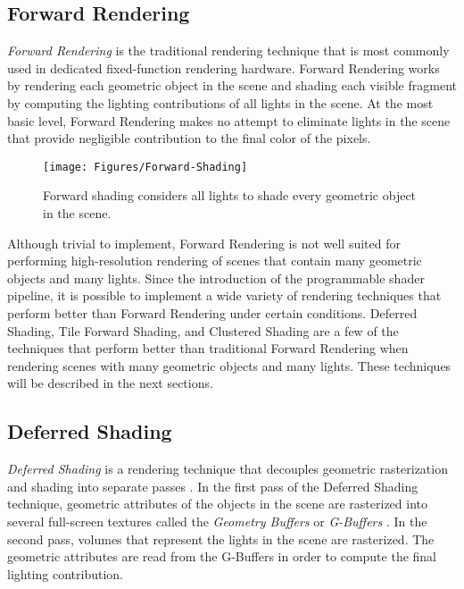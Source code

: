 \subsection{Forward Rendering}
\label{sec:ForwardRendering}

\emph{Forward Rendering} is the traditional rendering technique that is most commonly used in dedicated fixed-function rendering hardware. Forward Rendering works by rendering each geometric object in the scene and shading each visible fragment by computing the lighting contributions of all lights in the scene. At the most basic level, Forward Rendering makes no attempt to eliminate lights in the scene that provide negligible contribution to the final color of the pixels.

\begin{figure}[H]
\centering
\texttt{[image: Figures/Forward-Shading]}
\decoRule
\caption{Forward shading considers all lights to shade every geometric object in the scene.}
\label{fig:Forward-Shading}
\end{figure}

Although trivial to implement, Forward Rendering is not well suited for performing high-resolution rendering of scenes that contain many geometric objects and many lights. Since the introduction of the programmable shader pipeline, it is possible to implement a wide variety of rendering techniques that perform better than Forward Rendering under certain conditions. Deferred Shading, Tile Forward Shading, and Clustered Shading are a few of the techniques that perform better than traditional Forward Rendering when rendering scenes with many geometric objects and many lights. These techniques will be described in the next sections.

\subsection{Deferred Shading}

\emph{Deferred Shading} is a rendering technique that decouples geometric rasterization and shading into separate passes \parencite{7_deering_1988, 42_hargreaves_harris_2004}. In the first pass of the Deferred Shading technique, geometric attributes of the objects in the scene are rasterized into several full-screen textures called the \emph{Geometry Buffers} or \emph{G-Buffers} \parencite{12_saitotakahashi_1990}. In the second pass, volumes that represent the lights in the scene are rasterized. The geometric attributes are read from the G-Buffers in order to compute the final lighting contribution.

